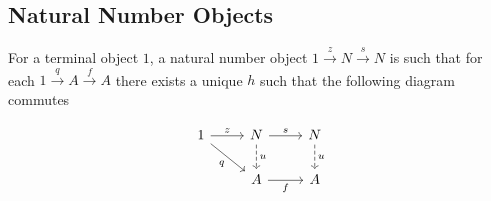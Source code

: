 \subsection{Natural Number Objects}
\begin{definition}
	For a terminal object $1$, a natural number object
	$1\overset{z}{\to}N\overset{s}{\to}N$ is such that for each
	$1\overset{q}{\to}A\overset{f}{\to}A$ there exists a unique $h$ such that the
	following diagram commutes \parencite{awodey:category_theory}

	\[\begin{tikzcd}
		1 & N & N \\
		& A & A
		\arrow["z", from=1-1, to=1-2]
		\arrow["q"', from=1-1, to=2-2]
		\arrow["s", from=1-2, to=1-3]
		\arrow["f"', from=2-2, to=2-3]
		\arrow["u", dashed, from=1-2, to=2-2]
		\arrow["u", dashed, from=1-3, to=2-3]
	\end{tikzcd}\]
\end{definition}
